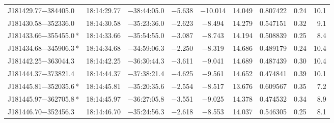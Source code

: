 \begin{table*}
\begin{tabular}{lcccccccr}
J181429.77$-$384405.0 & 18:14:29.77 & $-$38:44:05.0 & $-$5.638 & $-$10.014 & 14.049 & 0.807422 & 0.24 & 10.1 \\
J181430.58$-$352336.0 & 18:14:30.58 & $-$35:23:36.0 & $-$2.623 & $-$8.494 & 14.279 & 0.547151 & 0.32 & 9.1 \\
J181433.66$-$355455.0\,* & 18:14:33.66 & $-$35:54:55.0 & $-$3.087 & $-$8.743 & 14.194 & 0.508839 & 0.25 & 8.4 \\
J181434.68$-$345906.3\,* & 18:14:34.68 & $-$34:59:06.3 & $-$2.250 & $-$8.319 & 14.686 & 0.489179 & 0.24 & 10.4 \\
J181442.25$-$363044.3 & 18:14:42.25 & $-$36:30:44.3 & $-$3.611 & $-$9.041 & 14.689 & 0.487439 & 0.30 & 10.4 \\
J181444.37$-$373821.4 & 18:14:44.37 & $-$37:38:21.4 & $-$4.625 & $-$9.561 & 14.652 & 0.474841 & 0.39 & 10.1 \\
J181445.81$-$352035.6\,* & 18:14:45.81 & $-$35:20:35.6 & $-$2.554 & $-$8.517 & 13.676 & 0.609567 & 0.35 & 7.2 \\
J181445.97$-$362705.8\,* & 18:14:45.97 & $-$36:27:05.8 & $-$3.551 & $-$9.025 & 14.378 & 0.474532 & 0.34 & 8.9 \\
J181446.70$-$352456.3 & 18:14:46.70 & $-$35:24:56.3 & $-$2.618 & $-$8.553 & 14.037 & 0.546305 & 0.25 & 8.1 \\
\hline
\end{tabular}
\end{table*}

\addtocounter{table}{-1}

